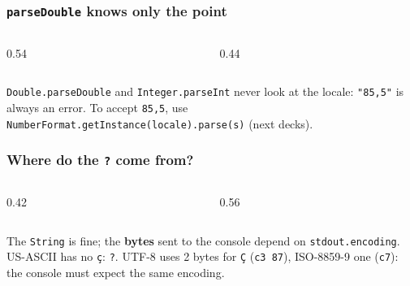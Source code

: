 \documentclass[aspectratio=169,10pt,compress]{beamer}
\begin{document}
\begin{frame}[t,fragile] \frametitle{\texttt{parseDouble} knows only the point}
  \begin{columns}[T]
    \begin{column}{0.54\textwidth}
    \end{column}
    \begin{column}{0.44\textwidth}
    \end{column}
  \end{columns}

  \vspace{0.1em}
  \small \texttt{Double.parseDouble} and \texttt{Integer.parseInt} never look at the locale:
  \texttt{"85,5"} is always an error. To accept \texttt{85,5}, use \texttt{NumberFormat.getInstance(locale).parse(s)}
  (next decks).
\end{frame}





\begin{frame}[t,fragile] \frametitle{Where do the \texttt{?} come from?}
  \begin{columns}[T]
    \begin{column}{0.42\textwidth}
    \end{column}
    \begin{column}{0.56\textwidth}
    \end{column}
  \end{columns}

  \vspace{0.1em}
  \small The \texttt{String} is fine; the \textbf{bytes} sent to the console depend on \texttt{stdout.encoding}.
  US-ASCII has no \texttt{ç}: \texttt{?}. UTF-8 uses 2 bytes for \texttt{Ç} (\texttt{c3 87}), ISO-8859-9 one (\texttt{c7}):
  the console must expect the same encoding.
\end{frame}
\end{document}
